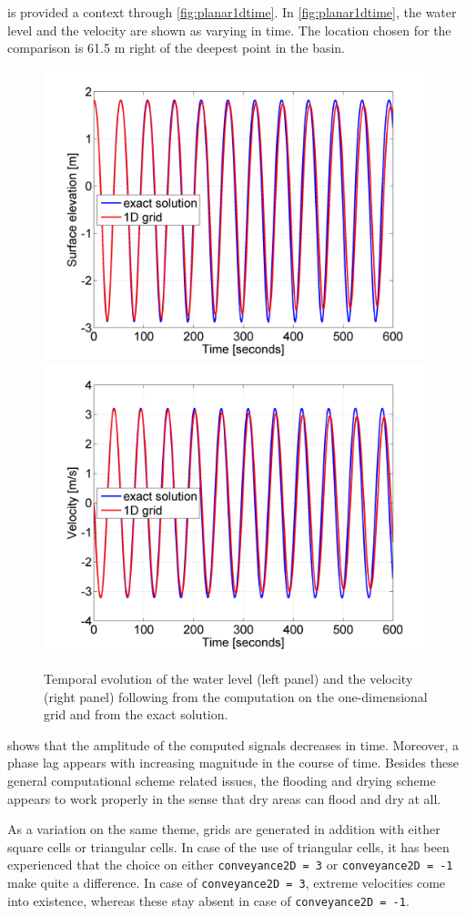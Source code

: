  is provided a context through \autoref{fig:planar1dtime}. In \autoref{fig:planar1dtime}, the water level and the velocity are shown as varying in time. The location chosen for the comparison is 61.5 m right of the deepest point in the basin.
\begin{figure}[h!]
\begin{center}
\includegraphics[width=0.49\columnwidth]{figures/planar1dwaterlevel.png}
\includegraphics[width=0.49\columnwidth]{figures/planar1dvelocity.png}
\end{center}\caption{Temporal evolution of the water level (left panel) and the velocity (right panel) following from the computation on the one-dimensional grid and from the exact solution. \label{fig:planar1dtime}}
\end{figure}

 shows that the amplitude of the computed signals decreases in time. Moreover, a phase lag appears with increasing magnitude in the course of time. Besides these general computational scheme related issues, the flooding and drying scheme appears to work properly in the sense that dry areas can flood and dry at all. 

As a variation on the same theme, grids are generated in addition with either square cells or triangular cells. In case of the use of triangular cells, it has been experienced that the choice on either \texttt{conveyance2D = 3} or \texttt{conveyance2D = -1} make quite a difference. In case of \texttt{conveyance2D = 3}, extreme velocities come into existence, whereas these stay absent in case of \texttt{conveyance2D = -1}. 

